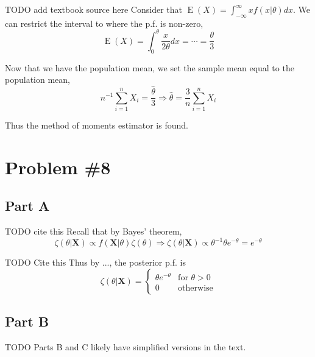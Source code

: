 \documentclass{article}
\begin{document}
TODO add textbook source here
Consider that $\operatorname{E}(X) = \int_{-\infty}^\infty x f(x | \theta)dx$.
We can restrict the interval to where the p.f. is non-zero,
\[
    \operatorname{E}(X) = \int_0^\theta \frac{x}{2\theta}dx = \cdots = \frac{\theta}{3}
\]

Now that we have the population mean, we set the sample mean equal to the population mean,
\[
    n^{-1}\sum_{i = 1}^n X_i = \frac{\hat{\theta}}{3} \Longrightarrow \hat{\theta} = \frac{3}{n}\sum_{i = 1}^n X_i
\]

Thus the method of moments estimator is found.

\section*{Problem \#8}

\subsection*{Part A}



TODO cite this
Recall that by Bayes' theorem,
\[
    \zeta(\theta | \bm{X}) \propto f(\bm{X}|\theta)\zeta(\theta) \Longrightarrow \zeta(\theta | \bm{X}) \propto \theta^{-1}\theta e^{-\theta} = e^{-\theta}
\]

TODO Cite this
Thus by ..., the posterior p.f. is
\[
    \zeta(\theta | \bm{X}) =
    \begin{cases}
        \theta e^{-\theta} & \text{for } \theta > 0\\
        0 & \text{otherwise}
    \end{cases}
\]

\subsection*{Part B}

TODO Parts B and C likely have simplified versions in the text.
\end{document}
